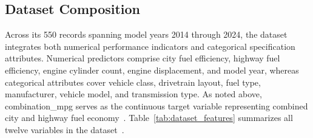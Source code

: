 \subsection{Dataset Composition}

Across its 550 records spanning model years 2014 through 2024, the dataset integrates both numerical performance indicators and categorical specification attributes. Numerical predictors comprise city fuel efficiency, highway fuel efficiency, engine cylinder count, engine displacement, and model year, whereas categorical attributes cover vehicle class, drivetrain layout, fuel type, manufacturer, vehicle model, and transmission type. As noted above, combination\_mpg serves as the continuous target variable representing combined city and highway fuel economy~\cite{atique2026explainable}. Table~\ref{tab:dataset_features} summarizes all twelve variables in the dataset~\cite{atique2026explainable}.

